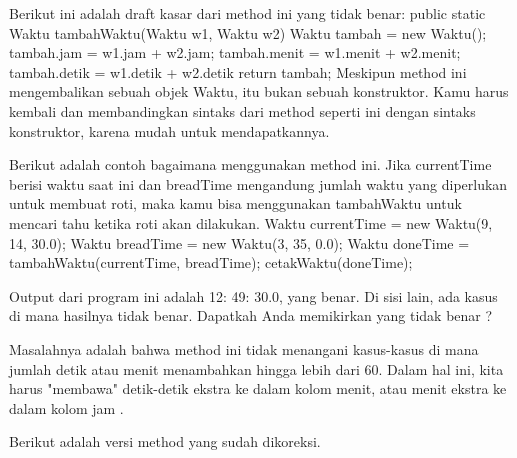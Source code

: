 Berikut ini adalah draft kasar dari method ini yang tidak benar:
\newline \newline
public static Waktu tambahWaktu(Waktu w1, Waktu w2)\textbraceleft \newline
	Waktu tambah = new Waktu(); \newline
	tambah.jam = w1.jam + w2.jam; \newline
	tambah.menit = w1.menit + w2.menit; \newline
	tambah.detik = w1.detik + w2.detik \newline
	return tambah; \newline
\textbraceright \newline \newline
Meskipun method ini mengembalikan sebuah objek Waktu, itu bukan sebuah konstruktor. Kamu harus kembali dan membandingkan sintaks dari method seperti ini dengan sintaks konstruktor, karena mudah untuk mendapatkannya.

Berikut adalah contoh bagaimana menggunakan method ini. Jika currentTime berisi waktu saat ini dan breadTime mengandung jumlah waktu yang diperlukan untuk membuat roti, maka kamu bisa menggunakan tambahWaktu untuk mencari tahu ketika roti akan dilakukan.
\newline
Waktu currentTime = new Waktu(9, 14, 30.0); \newline
Waktu breadTime = new Waktu(3, 35, 0.0); \newline
Waktu doneTime = tambahWaktu(currentTime, breadTime); \newline
cetakWaktu(doneTime); \newline

Output dari program ini adalah 12: 49: 30.0, yang benar. Di sisi lain, ada kasus di mana hasilnya tidak benar. Dapatkah Anda memikirkan yang tidak benar ?

Masalahnya adalah bahwa method ini tidak menangani kasus-kasus di mana jumlah detik atau menit menambahkan hingga lebih dari 60. Dalam hal ini, kita harus "membawa" detik-detik ekstra ke dalam kolom menit, atau menit ekstra ke dalam kolom jam .

Berikut adalah versi method yang sudah dikoreksi.

